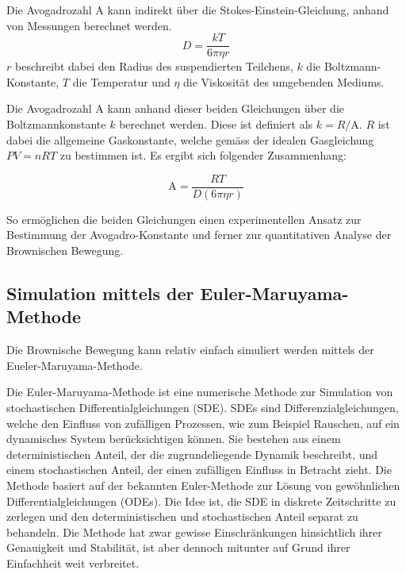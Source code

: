 Die Avogadrozahl $ \mathrm{A} $ kann indirekt über die Stokes-Einstein-Gleichung, anhand von Messungen berechnet werden.
\begin{equation}
	D = \frac{kT}{6\pi\eta r}
\end{equation}
$ r $ beschreibt dabei den Radius des suspendierten Teilchens, $ k $ die Boltzmann-Konstante, $ T $ die Temperatur und $ \eta $ die Viskosität des umgebenden Mediums.

Die Avogadrozahl $ \mathrm{A} $ kann anhand dieser beiden Gleichungen über die Boltzmannkonstante $ k $ berechnet werden. Diese ist definiert als $ k = R/\mathrm{A} $. $ R $ ist dabei die allgemeine Gaskonstante, welche gemäss der idealen Gasgleichung $ PV = nRT $ zu bestimmen ist. Es ergibt sich folgender Zusammenhang:

\begin{equation}
	\mathrm{A} = \frac{R T}{D (6 \pi \eta r)}
\end{equation}


So ermöglichen die beiden Gleichungen einen experimentellen Ansatz zur Bestimmung der Avogadro-Konstante und ferner zur quantitativen Analyse der Brownischen Bewegung.




\subsection{Simulation mittels der Euler-Maruyama-Methode
\label{brown:Simulation}}

Die Brownische Bewegung kann relativ einfach simuliert werden mittels der Eueler-Maruyama-Methode.

Die Euler-Maruyama-Methode ist eine numerische Methode zur Simulation von stochastischen Differentialgleichungen (SDE). SDEs sind Differenzialgleichungen, welche den Einfluss von zufälligen Prozessen, wie zum Beispiel Rauschen, auf ein dynamisches System berücksichtigen können. Sie bestehen aus einem deterministischen Anteil, der die zugrundeliegende Dynamik beschreibt, und einem stochastischen Anteil, der einen zufälligen Einfluss in Betracht zieht. Die Methode basiert auf der bekannten Euler-Methode zur Lösung von gewöhnlichen Differentialgleichungen (ODEs). Die Idee ist, die SDE in diskrete Zeitschritte zu zerlegen und den deterministischen und stochastischen Anteil separat zu behandeln. Die Methode hat zwar gewisse Einschränkungen hinsichtlich ihrer Genauigkeit und Stabilität, ist aber dennoch mitunter auf Grund ihrer Einfachheit weit verbreitet.

